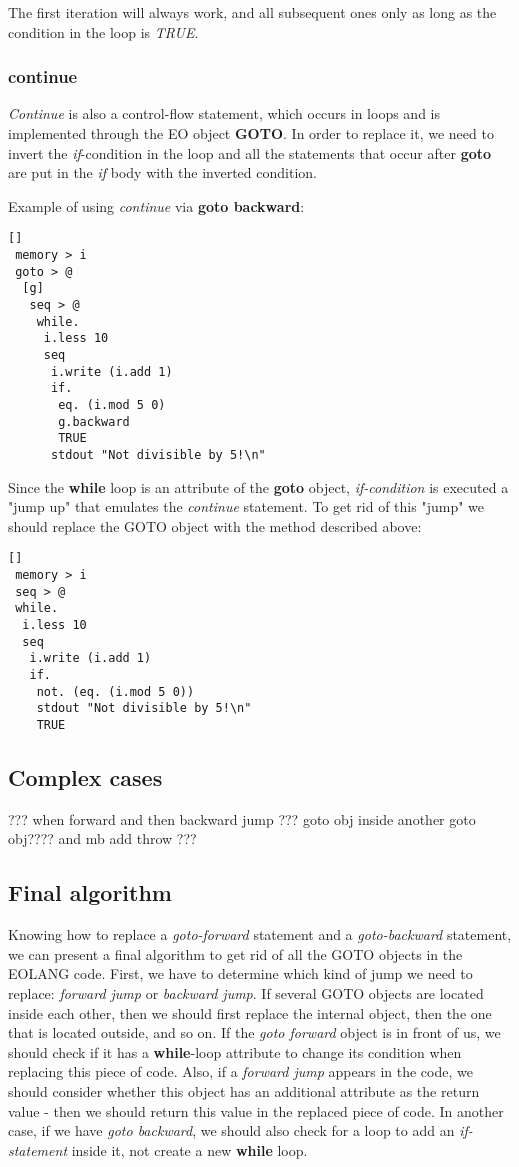 \documentclass[two column]{article}
\begin{document}
The first iteration will always work, and all subsequent ones only as long as the condition in the loop is \textit{TRUE}.

\subsubsection{continue}
\textit{Continue} is also a control-flow statement, which occurs in loops and is implemented through the EO object \textbf{GOTO}. In order to replace it, we need to invert the \textit{if}-condition in the loop and all the statements that occur after \textbf{goto} are put in the \textit{if} body with the inverted condition.

Example of using \textit{continue} via \textbf{goto backward}:
\begin{lstlisting}
[]
 memory > i
 goto > @
  [g]
   seq > @
    while.
     i.less 10
     seq
      i.write (i.add 1)
      if.
       eq. (i.mod 5 0)
       g.backward
       TRUE
      stdout "Not divisible by 5!\n"
\end{lstlisting}

Since the \textbf{while} loop is an attribute of the \textbf{goto} object, \textit{if-condition} is executed a "jump up" that emulates the \textit{continue} statement. To get rid of this "jump" we should replace the GOTO object with the method described above:
\begin{lstlisting}
[]
 memory > i
 seq > @
 while.
  i.less 10
  seq
   i.write (i.add 1)
   if.
    not. (eq. (i.mod 5 0))
    stdout "Not divisible by 5!\n"
    TRUE
\end{lstlisting}

\subsection{Complex cases}
??? when forward and then backward jump
???
goto obj inside another goto obj????
and mb add throw ???


\subsection{Final algorithm}
Knowing how to replace a \textit{goto-forward} statement and a \textit{goto-backward} statement, we can present a final algorithm to get rid of all the GOTO objects in the EOLANG code. First, we have to determine which kind of jump we need to replace: \textit{forward jump} or \textit{backward jump}. If several GOTO objects are located inside each other, then we should first replace the internal object, then the one that is located outside, and so on. If the \textit{goto forward} object is in front of us, we should check if it has a \textbf{while}-loop attribute to change its condition when replacing this piece of code. Also, if a \textit{forward jump} appears in the code, we should consider whether this object has an additional attribute as the return value - then we should return this value in the replaced piece of code. In another case, if we have \textit{goto backward}, we should also check for a loop to add an \textit{if-statement} inside it, not create a new \textbf{while} loop.
\end{document}
